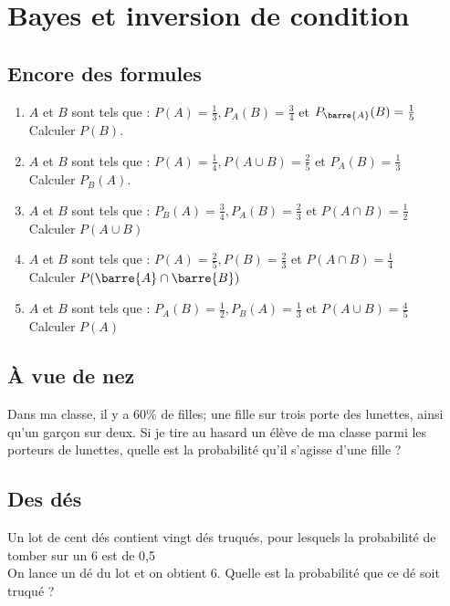 \documentclass[oneside,12pt]{book}          %
\begin{document}
\section{Bayes et inversion de condition}


\subsection{Encore des formules}
\begin{enumerate}
    \item $A$ et $B$ sont tels que : $P(A)=\frac{1}{3},P_{A}(B)=\frac{3}{4}$ et $P_{\barre{A}}(B)=\frac{1}{5}$ \\
    Calculer $P(B)$.
    \item $A$ et $B$ sont tels que : $P(A)=\frac{1}{4},P(A\cup B)=\frac{2}{5}$ et $P_{A}(B)=\frac{1}{3}$ \\
    Calculer $P_{B}(A)$.
    \item $A$ et $B$ sont tels que : $P_B(A)=\frac{3}{4},P_A(B)=\frac{2}{3}$ et $P(A\cap B)=\frac{1}{2}$ \\
    Calculer $P(A\cup B)$
    \item $A$ et $B$ sont tels que : $P(A)=\frac{2}{5},P(B)=\frac{2}{3}$ et $P(A\cap B)=\frac{1}{4}$\\				Calculer $P(\barre{A}\cap\barre{B})$
    \item $A$ et $B$ sont tels que : $P_A(B)=\frac{1}{2} , P_B(A)=\frac{1}{3}$ et $P(A\cup B)=\frac{4}{5}$\\
    Calculer $P(A)$
\end{enumerate}



\subsection{À vue de nez}
 Dans ma classe, il y a 60$\%$ de filles; une fille sur trois porte des lunettes, ainsi qu'un garçon sur deux. Si je tire au hasard un élève de ma classe parmi les porteurs de lunettes, quelle est la probabilité qu'il s'agisse d'une fille ?



\subsection{Des dés}
 Un lot de cent dés contient vingt dés truqués, pour lesquels la probabilité de tomber sur un 6 est de 0,5 \\
On lance un dé du lot et on obtient 6. Quelle est la probabilité que ce dé soit truqué ?
\end{document}
